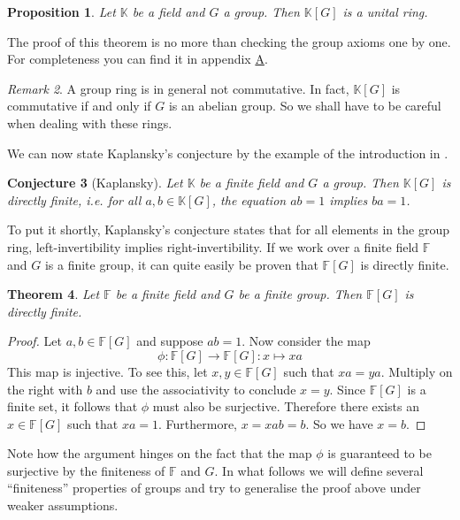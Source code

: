 \documentclass[titlepage, a4paper]{article}
\newcommand{\F}{\mathbb{F}}
\theoremstyle{theoremdd}
\newtheorem{theorem}{Theorem}[section]
\newtheorem{proposition}[theorem]{Proposition}
\newtheorem{conjecture}[theorem]{Conjecture}
\theoremstyle{definition}
\theoremstyle{remark}
\newtheorem{remark}[theorem]{Remark}
\begin{document}
\begin{proposition}
    Let $\mathbb K$ be a field and $G$ a group. Then $\mathbb K[G]$ is a unital ring.
\end{proposition}
The proof of this theorem is no more than checking the group axioms one by one. For completeness you can find it in appendix \hyperlink{sec:proof_groupring}{A}.

\begin{remark}
	A group ring is in general not commutative. In fact, $\mathbb{K}[G]$ is commutative if and only if $G$ is an abelian group. So we shall have to be careful when dealing with these rings. 
\end{remark}

We can now state Kaplansky's conjecture by the example of the introduction in \cite{elek_szabo_2003}.

\begin{conjecture}[Kaplansky]
	Let $\mathbb K$ be a finite field and $G$ a group. Then $\mathbb K[G]$ is directly finite, i.e. for all $a, b \in \mathbb K[G]$, the equation $ab=1$ implies $ba=1$.
\end{conjecture}

To put it shortly, Kaplansky's conjecture states that for all elements in the group ring, left-invertibility implies right-invertibility. If we work over a finite field $\F$ and $G$ is a finite group, it can quite easily be proven that $\F[G]$ is directly finite.

\begin{theorem}
    Let $\F$ be a finite field and $G$ be a finite group. Then $\F[G]$ is directly finite. 
\end{theorem}
\begin{proof}
    Let $a, b \in \mathbb F[G]$ and suppose $ab=1$. Now consider the map
    \[
        \phi: \mathbb F[G] \to \mathbb F[G]: x \mapsto x a
    \]
    This map is injective. To see this, let $x, y \in \mathbb F[G]$ such that $xa=ya$. Multiply on the right with $b$ and use the associativity to conclude $x=y$.
    Since $\mathbb F[G]$ is a finite set, it follows that $\phi$ must also be surjective. Therefore there exists an $x \in \mathbb F[G]$ such that $x a = 1$. Furthermore, $x = xab = b$. So we have $x = b$.
\end{proof}

Note how the argument hinges on the fact that the map $\phi$ is guaranteed to be surjective by the finiteness of $\mathbb F$ and $G$. In what follows we will define several ``finiteness'' properties of groups and try to generalise the proof above under weaker assumptions.
\end{document}
